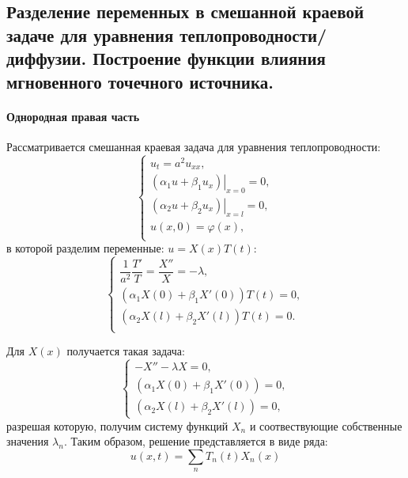 \subsection{Разделение переменных в смешанной краевой задаче для уравнения теплопроводности/диффузии.
Построение функции влияния мгновенного точечного источника.}
\label{question:split-variables-in-heat}

\paragraph{Однородная правая часть} Рассматривается смешанная краевая задача для уравнения
теплопроводности:
\begin{equation}\label{1.10-main-homogeneous}
  \begin{cases}
    u_t = a^2 u_{xx}, \\
    \left. \left( \alpha_1 u + \beta_1 u_x \right) \right|_{x=0} = 0, \\
    \left. \left( \alpha_2 u + \beta_2 u_x \right) \right|_{x = l} = 0, \\
    u(x, 0) = \varphi(x), \\
  \end{cases}
\end{equation}
в которой разделим переменные: $u = X(x) T(t)$:
\[
  \begin{cases}
    \dfrac{1}{a^2} \dfrac{T'}{T} = \dfrac{X''}{X} = - \lambda, \\
    \left( \alpha_1 X(0) + \beta_1 X'(0) \right) T(t) = 0, \\
    \left( \alpha_2 X(l) + \beta_2 X'(l) \right) T(t) = 0. \\
  \end{cases}
\]

Для $X(x)$ получается такая задача:
\[
  \begin{cases}
    -X'' - \lambda X = 0, \\
    \left( \alpha_1 X(0) + \beta_1 X'(0) \right) = 0, \\
    \left( \alpha_2 X(l) + \beta_2 X'(l) \right) = 0,
  \end{cases}
\]
разрешая которую, получим систему функций $X_n$ и соотвествующие собственные значения
$\lambda_n$. Таким образом, решение представляется в виде ряда:
\[
  u(x, t) = \sum_n T_n(t) X_n(x)
\]

